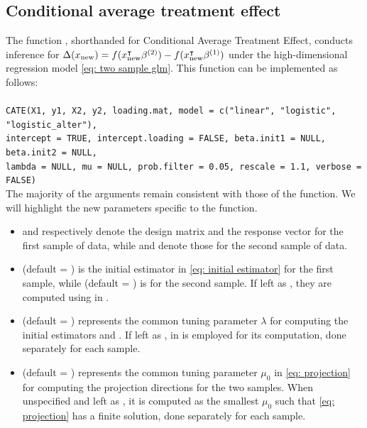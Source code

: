 \subsection{Conditional average treatment effect}
\label{subsec: CATE}
The function , shorthanded for Conditional Average Treatment Effect, conducts inference for $\Delta(x_{\rm new}) = f(x_{\rm new}^{\intercal}\beta^{(2)})-f(x_{\rm new}^\intercal \beta^{(1)})$ under the high-dimensional regression model \eqref{eq: two sample glm}. 
This function can be implemented as follows:\\
\\
\texttt{CATE(X1, y1, X2, y2, loading.mat, model = c("linear", "logistic", "logistic\_alter"),\\
\indent intercept = TRUE, intercept.loading = FALSE, beta.init1 = NULL, beta.init2 = NULL, \\
\indent lambda = NULL, mu = NULL, prob.filter = 0.05, rescale = 1.1, verbose = FALSE)}
\\

\noindent The majority of the arguments remain consistent with those of the  function. We will highlight the new parameters specific to the  function. %
\begin{itemize}
    \item {} and  respectively denote the design matrix and the response vector for the first sample of data, while  and  denote those for the second sample of data.
    \item {} (default = ) is the initial estimator in \eqref{eq: initial estimator} for the first sample, while  (default = ) is for the second sample. If left as , they are computed using  in .
    \item {} (default = ) represents the common tuning parameter $\lambda$ for computing the initial estimators  and . If left as ,  in  is employed for its computation, done separately for each sample.
    \item {} (default = ) represents the common tuning parameter $\mu_0$ in \eqref{eq: projection} for computing the projection directions for the two samples. When unspecified and left as , it is computed as the smallest $\mu_0$ such that \eqref{eq: projection} has a finite solution, done separately for each sample.
\end{itemize}


